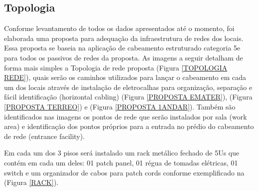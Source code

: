 \documentclass[	DIV=calc,%
							paper=a4,%
							fontsize=12pt,%
							onecolumn]{scrartcl}	 					%
\begin{document}
\subsection{Topologia}

Conforme levantamento de todos os dados apresentados até o momento, foi elaborada uma proposta para adequação da infraestrutura de redes dos locais. Essa proposta se baseia na aplicação de cabeamento estruturado categoria 5e para todos os passivos de redes da proposta. As imagens a seguir detalham de forma mais simples a Topologia de rede proposta (Figura \ref{TOPOLOGIA REDE}), quais serão os caminhos utilizados para lançar o cabeamento em cada um dos locais através de instalação de eletrocalhas para organização, separação e fácil identificação  (horizontal cabling) (Figura \ref{PROPOSTA EMATER}), (Figura \ref{PROPOSTA TERREO}) e (Figura \ref{PROPOSTA 1ANDAR}). Também são identificados nas imagens os pontos de rede que serão instalados por sala (work area) e identificação dos pontos próprios para a entrada no prédio do cabeamento de rede (entrance facility).

Em cada um dos 3 pisos será instalado um rack metálico fechado de 5Us que contém em cada um deles: 01 patch panel, 01 régua de tomadas elétricas, 01 switch e um organizador de cabos para patch cords conforme exemplificado na (Figura \ref{RACK}).



\end{document}
